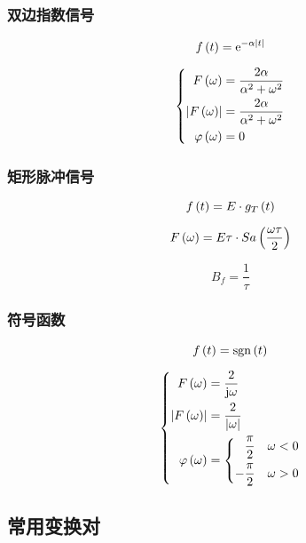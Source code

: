 \documentclass{article}
\begin{document}
\subsubsection{双边指数信号}

\[f\left(t\right)=\mathrm e^{-\alpha\left|t\right|}\]

\[\left\{\begin{aligned}
        F\left(\omega\right)                  & =\frac{2\alpha}{\alpha^2+\omega^2} \\
        \left|F\left(\omega\right)\right|            & =\frac{2\alpha}{\alpha^2+\omega^2} \\
        \varphi\left(\omega\right) & =0
    \end{aligned}\right.\]

\subsubsection{矩形脉冲信号}

\[f\left(t\right)=E\cdot g_T\left(t\right)\]

\[F\left(\omega\right)=E\tau\cdot Sa\left(\frac{\omega\tau}2\right)\]

\[B_f=\frac1\tau\]

\subsubsection{符号函数}

\[f\left(t\right)=\mathrm{sgn}\left(t\right)\]

\[\left\{\begin{aligned}
        F\left(\omega\right)                  & =\frac2{\mathrm j\omega}   \\
        \left|F\left(\omega\right)\right|            & =\frac2{\left|\omega\right|} \\
        \varphi\left(\omega\right) & =
        \left\{\begin{aligned}
                   \frac\pi2  &  & \omega<0 \\
                   -\frac\pi2 &  & \omega>0
               \end{aligned}\right.
    \end{aligned}\right.\]

\subsection{常用变换对}
\end{document}
